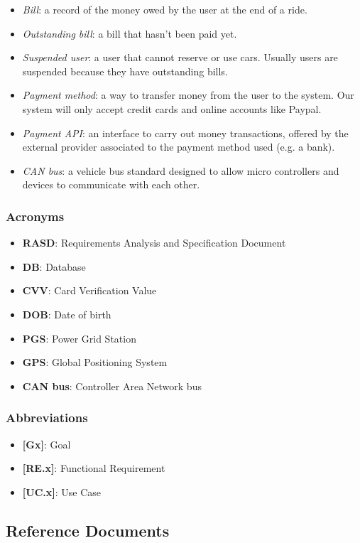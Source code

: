 \documentclass[english]{article}
\begin{document}
\begin{itemize}
\item{\textit{Bill}: a record of the money owed by the user at the end of a ride.}
\item{\textit{Outstanding bill}: a bill that hasn’t been paid yet. }
\item{\textit{Suspended user}: a user that cannot reserve or use cars. Usually users are suspended because they have outstanding bills.}
\item{\textit{Payment method}: a way to transfer money from the user to the system. Our system will only accept credit cards and online accounts like Paypal.}
\item{\textit{Payment API}: an interface to carry out money transactions, offered by the external provider associated to the payment method used (e.g. a bank).}
\item{\textit{CAN bus}: a vehicle bus standard designed to allow micro controllers and devices to communicate with each other.}
\end{itemize}

\subsubsection{Acronyms}
\begin{itemize}
\item{\textbf{RASD}: Requirements Analysis and Specification Document}
\item{\textbf{DB}: Database}
\item{\textbf{CVV}: Card Verification Value}
\item{\textbf{DOB}: Date of birth}
\item{\textbf{PGS}: Power Grid Station}
\item{\textbf{GPS}: Global Positioning System}
\item{\textbf{CAN bus}: Controller Area Network bus}
\end{itemize}

\subsubsection{Abbreviations}
\begin{itemize}
\item{\textbf{[Gx]}: Goal}
\item{\textbf{[RE.x]}: Functional Requirement}
\item{\textbf{[UC.x]}: Use Case}
\end{itemize}

\subsection{Reference Documents}
\end{document}
